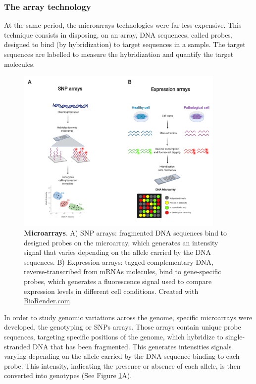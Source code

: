 \subsubsection*{The array technology}

At the same period, the microarrays technologies were far less expensive. This technique consists in disposing, on an array, \gls*{DNA} sequences, called probes, designed to bind (by hybridization) to target sequences in a sample. The target sequences are labelled to measure the hybridization and quantify the target molecules. %
\begin{figure}[H]
    \centering
    \includegraphics[width=0.9\textwidth]{Figures/Intro/arrays.pdf}
    \caption[Microarrays]{\textbf{Microarrays}. A) \gls*{SNP} arrays: fragmented \gls*{DNA} sequences bind to designed probes on the microarray, which generates an intensity signal that varies depending on the allele carried by the \gls*{DNA} sequences. B) Expression arrays: tagged complementary \gls*{DNA}, reverse-transcribed from \gls{mRNAs} molecules, bind to gene-specific probes, which generates a fluorescence signal used to compare expression levels in different cell conditions. Created with \href{https://biorender.com/}{BioRender.com}}
    \label{fig:intro_arrays}
\end{figure}
In order to study genomic variations across the genome, specific microarrays were developed, the genotyping or \gls*{SNP}s arrays. Those arrays contain unique probe sequences, targeting specific positions of the genome, which hybridize to single-stranded \gls*{DNA} that has been fragmented. This generates intensities signals varying depending on the allele carried by the \gls*{DNA} sequence binding to each probe. This intensity, indicating the presence or absence of each allele, is then converted into genotypes \cite{Laframboise2009} (See Figure \ref{fig:intro_arrays}A). %
